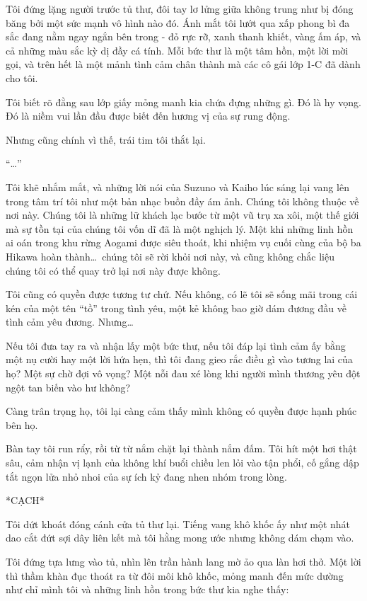 \documentclass[../main.tex]{subfiles}
\begin{document}
\newpage
\label{canon}

Tôi đứng lặng người trước tủ thư, đôi tay lơ lửng giữa không trung như bị đóng băng bởi một sức mạnh vô hình nào đó. Ánh mắt tôi lướt qua xấp phong bì đa sắc đang nằm ngay ngắn bên trong - đỏ rực rỡ, xanh thanh khiết, vàng ấm áp, và cả những màu sắc kỳ dị đầy cá tính. Mỗi bức thư là một tâm hồn, một lời mời gọi, và trên hết là một mảnh tình cảm chân thành mà các cô gái lớp 1-C đã dành cho tôi.

Tôi biết rõ đằng sau lớp giấy mỏng manh kia chứa đựng những gì. Đó là hy vọng. Đó là niềm vui lần đầu được biết đến hương vị của sự rung động.

Nhưng cũng chính vì thế, trái tim tôi thắt lại.

``\dots''

Tôi khẽ nhắm mắt, và những lời nói của Suzuno và Kaiho lúc sáng lại vang lên trong tâm trí tôi như một bản nhạc buồn đầy ám ảnh. Chúng tôi không thuộc về nơi này. Chúng tôi là những lữ khách lạc bước từ một vũ trụ xa xôi, một thế giới mà sự tồn tại của chúng tôi vốn dĩ đã là một nghịch lý. Một khi những linh hồn ai oán trong khu rừng Aogami được siêu thoát, khi nhiệm vụ cuối cùng của bộ ba Hikawa hoàn thành\dots\ chúng tôi sẽ rời khỏi nơi này, và cũng không chắc liệu chúng tôi có thể quay trở lại nơi này được không.

Tôi cũng có quyền được tương tư chứ. Nếu không, có lẽ tôi sẽ sống mãi trong cái kén của một tên ``tồ'' trong tình yêu, một kẻ không bao giờ dám đương đầu về tình cảm yêu đương. Nhưng\dots

Nếu tôi đưa tay ra và nhận lấy một bức thư, nếu tôi đáp lại tình cảm ấy bằng một nụ cười hay một lời hứa hẹn, thì tôi đang gieo rắc điều gì vào tương lai của họ? Một sự chờ đợi vô vọng? Một nỗi đau xé lòng khi người mình thương yêu đột ngột tan biến vào hư không?

Càng trân trọng họ, tôi lại càng cảm thấy mình không có quyền được hạnh phúc bên họ.

Bàn tay tôi run rẩy, rồi từ từ nắm chặt lại thành nắm đấm. Tôi hít một hơi thật sâu, cảm nhận vị lạnh của không khí buổi chiều len lỏi vào tận phổi, cố gắng dập tắt ngọn lửa nhỏ nhoi của sự ích kỷ đang nhen nhóm trong lòng.

*CẠCH*

Tôi dứt khoát đóng cánh cửa tủ thư lại. Tiếng vang khô khốc ấy như một nhát dao cắt đứt sợi dây liên kết mà tôi hằng mong ước nhưng không dám chạm vào.

Tôi đứng tựa lưng vào tủ, nhìn lên trần hành lang mờ ảo qua làn hơi thở. Một lời thì thầm khàn đục thoát ra từ đôi môi khô khốc, mỏng manh đến mức dường như chỉ mình tôi và những linh hồn trong bức thư kia nghe thấy:
\end{document}
